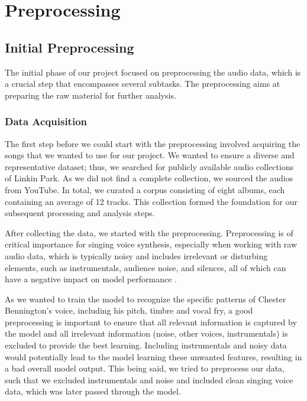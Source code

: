 \documentclass[a4paper]{article}
\begin{document}
	\newpage
	
	\section{Preprocessing}
	
	\subsection{Initial Preprocessing}
	The initial phase of our project focused on preprocessing the audio data, which is a crucial step that encompasses several subtasks. The preprocessing aims at preparing the raw material for further analysis.
	
	\subsubsection{Data Acquisition}
	The first step before we could start with the preprocessing involved acquiring the songs that we wanted to use for our project. We wanted to ensure a diverse and representative dataset; thus, we searched for publicly available audio collections of Linkin Park. As we did not find a complete collection, we sourced the audios from YouTube. In total, we curated a corpus consisting of eight albums, each containing an average of 12 tracks. This collection formed the foundation for our subsequent processing and analysis steps.
	
	After collecting the data, we started with the preprocessing. Preprocessing is of critical importance for singing voice synthesis, especially when working with raw audio data, which is typically noisy and includes irrelevant or disturbing elements, such as instrumentals, audience noise, and silences, all of which can have a negative impact on model performance \cite{Kulkarni2023}.
	
	As we wanted to train the model to recognize the specific patterns of Chester Bennington’s voice, including his pitch, timbre and vocal fry, a good preprocessing is important to ensure that all relevant information is captured by the model and all irrelevant information (noise, other voices, instrumentals) is excluded to provide the best learning. Including instrumentals and noisy data would potentially lead to the model learning these unwanted features, resulting in a bad overall model output. This being said, we tried to preprocess our data, such that we excluded instrumentals and noise and included clean singing voice data, which was later passed through the model.
	
\end{document}

